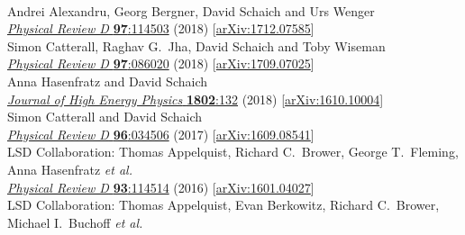\begin{spacelist}
\begin{revnumerate}
    \pagebreakitem
       \\
      Andrei Alexandru, Georg Bergner, David Schaich and Urs Wenger \\
      \href{https://doi.org/10.1103/PhysRevD.97.114503}{\textit{Physical Review D} \textbf{97}:114503} (2018) [\href{http://arxiv.org/abs/1712.07585}{arXiv:1712.07585}]
    \pagebreakitem
       \\
      Simon Catterall, Raghav G.~Jha, David Schaich and Toby Wiseman \\
      \href{https://doi.org/10.1103/PhysRevD.97.086020}{\textit{Physical Review D} \textbf{97}:086020} (2018) [\href{http://arxiv.org/abs/1709.07025}{arXiv:1709.07025}]
    \pagebreakitem
       \\
      Anna Hasenfratz and David Schaich \\
      \href{https://doi.org/10.1007/JHEP02(2018)132}{\textit{Journal of High Energy Physics} \textbf{1802}:132} (2018) [\href{http://arxiv.org/abs/1610.10004}{arXiv:1610.10004}]
    \pagebreakitem
       \\
      Simon Catterall and David Schaich \\
      \href{https://doi.org/10.1103/PhysRevD.96.034506}{\textit{Physical Review D} \textbf{96}:034506} (2017) [\href{http://arxiv.org/abs/1609.08541}{arXiv:1609.08541}]
    \pagebreakitem
       \\
      LSD Collaboration: Thomas Appelquist, Richard C.~Brower, George T.~Fleming, Anna Hasenfratz \textit{et al.} \\ %
      \href{https://doi.org/10.1103/PhysRevD.93.114514}{\textit{Physical Review D} \textbf{93}:114514} (2016) [\href{http://arxiv.org/abs/1601.04027}{arXiv:1601.04027}]
    \pagebreakitem
       \\
      LSD Collaboration: Thomas Appelquist, Evan Berkowitz, Richard C.~Brower, Michael I.~Buchoff \textit{et al.} \\ %

\end{revnumerate}
\end{spacelist}
